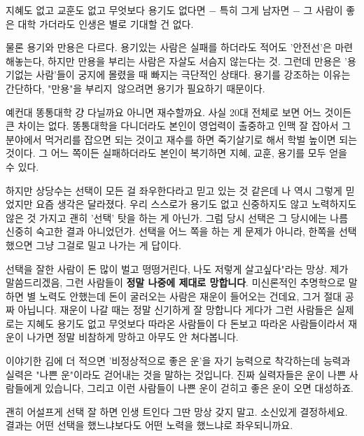 지혜도 없고 교훈도 없고 무엇보다 용기도 없다면 $-$ 특히 그게 남자면 $-$
그 사람이 좋은 대학 가더라도 인생은 별로 기대할 건 없다.
\vspace{5mm}

물론 용기와 만용은 다르다.
용기있는 사람은 실패를 하더라도 적어도 '안전선'은 마련해놓는다, 하지만 만용을 부리는 사람은 자살도 서슴지 않는다는 것.
그런데 만용은 '용기없는 사람'들이 궁지에 몰렸을 때 빠지는 극단적인 상태다.
용기를 강조하는 이유는 간단하다, "만용"을 부리지 않으려면 용기가 필요하기 때문이다.
\vspace{5mm}

예컨대 똥통대학 걍 다닐까요 아니면 재수할까요.
사실 20대 전체로 보면 어느 것이든 큰 차이는 없다.
똥통대학을 다니더라도 본인이 영업력이 출중하고 인맥 잘 잡아서 그 분야에서 먹거리를 잡으면 되는 것이고
재수를 하면 죽기살기로 해서 학벌 높이면 되는 것이다.
그 어느 쪽이든 실패하더라도 본인이 복기하면 지혜, 교훈, 용기를 모두 얻을 수 있다.
\vspace{5mm}

하지만 상당수는 선택이 모든 걸 좌우한다라고 믿고 있는 것 같은데
나 역시 그렇게 믿었지만 요즘 생각은 달라졌다.
우리 스스로가 용기도 없고 신중하지도 않고 노력하지도 않은 것 가지고 괜히 '선택' 탓을 하는 게 아닌가.
그럼 당시 선택은 그 당시에는 나름 신중히 숙고한 결과 아니었던가.
선택을 어느 쪽을 하는 게 문제가 아니라, 한쪽을 선택했으면 그냥 그걸로 밀고 나가는 게 답이다.
\vspace{5mm}

선택을 잘한 사람이 돈 많이 벌고 떵떵거린다, 나도 저렇게 살고싶다"라는 망상.
제가 말씀드리겠음, 그런 사람들이 \textbf{정말 나중에 제대로 망합니다}.
미신론적인 추명학으로 말하면 별 노력도 안했는데 돈이 굴러오는 사람은 재운이 들어오는 건데요,
그거 절대 공짜 아닙니다. 재운이 나갈 때는 정말 신기하게 잘 망합니다
게다가 그런 사람들은 실제로는 지혜도 용기도 없고 무엇보다 따라온 사람들이 다 돈보고 따라온 사람들이라서
재운이 나가면 정말 비참하게 망하고 아무도 안 쳐다봅니다.
\vspace{5mm}

이야기한 김에 더 적으면 '비정상적으로 좋은 운'을 자기 능력으로 착각하는데
능력과 실력은 "나쁜 운"이라도 걷어내는 것을 말하는 것입니다.
진짜 실력자들은 운이 나쁜 사람들에게 있습니다, 그리고 이런 사람들이 나쁜 운이 걷히고 좋은 운이 오면 대성하죠.
\vspace{5mm}

괜히 어설프게 선택 잘 하면 인생 트인다 그딴 망상 갖지 말고. 소신있게 결정하세요.
결과는 어떤 선택을 했느냐보다도 어떤 노력을 했느냐로 좌우되니까요.
\vspace{5mm}






